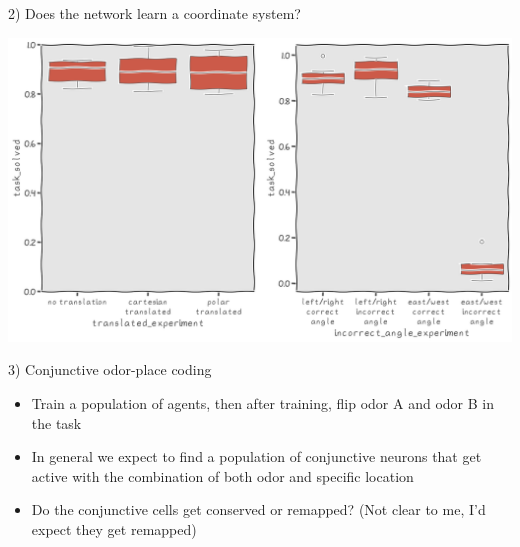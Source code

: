 \documentclass[bigger]{beamer}
\begin{document}
\begin{frame}[label={sec:org3ecf81b}]{2) Does the network learn a coordinate system?}
\begin{center}
\includegraphics[width=.9\linewidth]{img/exp2-boxplot.png}
\end{center}
\end{frame}
\begin{frame}[<+->][label={sec:orgd1b69a9}]{3) Conjunctive odor-place coding}
\begin{itemize}
\item Train a population of agents, then after training, flip odor A and odor B in the task
\item In general we expect to find a population of conjunctive neurons that get active with the combination of both odor and specific location
\item Do the conjunctive cells get conserved or remapped? (Not clear to me, I'd expect they get remapped)
\end{itemize}
\end{frame}
\end{document}
